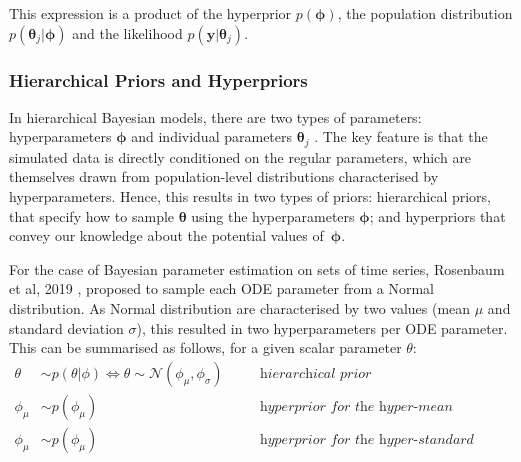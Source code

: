 \documentclass[11pt]{article}
\begin{document}
This expression is a product of the hyperprior $p(\boldsymbol{\phi})$, the population distribution $p(\boldsymbol{\theta}_j|\boldsymbol{\phi})$ and the likelihood $p(\boldsymbol{y}|\boldsymbol{\theta}_j)$.

\subsubsection{Hierarchical Priors and Hyperpriors}\label{sec:hierPriorsAndHyper}
In hierarchical Bayesian models, there are two types of parameters: hyperparameters $\boldsymbol{\phi}$ and individual parameters $\boldsymbol{\theta}_j$ \cite{tbk_gelman}. The key feature is that the simulated data is directly conditioned on the regular parameters, which are themselves drawn from population-level distributions characterised by hyperparameters. Hence, this results in two types of priors: hierarchical priors, that specify how to sample $\boldsymbol{\theta}$ using the hyperparameters $\boldsymbol{\phi}$; and hyperpriors that convey our knowledge about the potential values of~$\boldsymbol{\phi}$.

For the case of Bayesian parameter estimation on sets of time series, Rosenbaum et al, 2019 \cite{rosenbaum}, proposed to sample each ODE parameter from a Normal distribution. As Normal distribution are characterised by two values (mean $\mu$ and standard deviation $\sigma$), this resulted in two hyperparameters per ODE parameter. This can be summarised as follows, for a given scalar parameter $\theta$:
\begin{align*}
    \theta &\sim p(\theta | \phi) \Leftrightarrow \theta \sim \mathcal{N}(\phi_\mu, \phi_\sigma) \quad &&\textit{hierarchical prior} \\ 
    \phi_\mu &\sim p(\phi_\mu) \quad &&\textit{hyperprior for the hyper-mean} \\ 
    \phi_\mu &\sim p(\phi_\mu) \quad &&\textit{hyperprior for the hyper-standard deviation} 
\end{align*}
\end{document}
